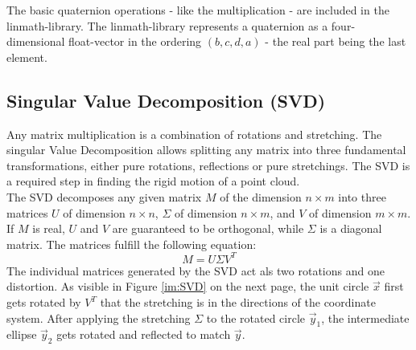 The basic quaternion operations - like the multiplication - are included in the linmath-library. The linmath-library represents a quaternion as a four-dimensional float-vector in the ordering $(b, c, d, a)$ - the real part being the last element.\\

\subsection{Singular Value Decomposition (SVD)}
\label{sec:SVD}
Any matrix multiplication is a combination of rotations and stretching. The singular Value Decomposition allows splitting any matrix into three fundamental transformations, either pure rotations, reflections or pure stretchings. The SVD is a required step in finding the rigid motion of a point cloud\cite{SVD_ETH}.\\
The SVD decomposes any given matrix $M$ of the dimension $n\times m$ into three matrices $U$ of dimension $n\times n$, $\Sigma$ of dimension $n\times m$, and $V$ of dimension $m\times m$.\cite{SVD_MIT} If $M$ is real, $U$ and $V$ are guaranteed to be orthogonal, while $\Sigma$ is a diagonal matrix. The matrices fulfill the following equation: 
\begin{equation*}
    M= U\Sigma V^{T}
\end{equation*}
The individual matrices generated by the SVD act als two rotations and one distortion. As visible in Figure \ref{im:SVD} on the next page, the unit circle $\vec{x}$ first gets rotated by $V^{T}$ that the stretching is in the directions of the coordinate system. After applying the stretching $\Sigma$ to the rotated circle $\vec{y}_{1}$, the intermediate ellipse $\vec{y}_{2}$ gets rotated and reflected to match $\vec{y}$. 
